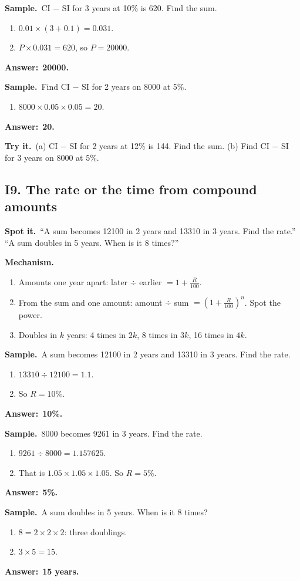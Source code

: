 \documentclass[11pt,a4paper]{article}
\let\oldsubsection\subsection
\renewcommand{\subsection}{\needspace{9\baselineskip}\oldsubsection}
\newcommand{\spot}{\textbf{\color{ember}Spot it.}\ }
\newcommand{\mech}{\textbf{\color{ember}Mechanism.}\ }
\newif\ifkeepsamp
\newcommand{\ans}[1]{\par\nopagebreak\noindent\textbf{\color{ember}Answer:}\ \textbf{#1}\par}
\newcommand{\samp}{\ifkeepsamp\needspace{4\baselineskip}\fi\textbf{\color{ember}Sample.}\ }
\newcommand{\tryit}[1]{\textbf{\color{ember}Try it.}\ #1}
\begin{document}
\samp CI $-$ SI for 3 years at 10\% is 620. Find the sum.
\begin{enumerate}
\item $0.01 \times (3 + 0.1) = 0.031$.
\item $P \times 0.031 = 620$, so $P = 20000$.
\end{enumerate}
\ans{20000.}

\samp Find CI $-$ SI for 2 years on 8000 at 5\%.
\begin{enumerate}
\item $8000 \times 0.05 \times 0.05 = 20$.
\end{enumerate}
\ans{20.}

\tryit (a) CI $-$ SI for 2 years at 12\% is 144. Find the sum. (b) Find CI $-$ SI for 3 years on 8000 at 5\%.

\subsection{I9. The rate or the time from compound amounts}
\spot ``A sum becomes 12100 in 2 years and 13310 in 3 years. Find the rate.'' ``A sum doubles in 5 years. When is it 8 times?''

\mech
\begin{enumerate}
\item Amounts one year apart: later $\div$ earlier $= 1 + \tfrac{R}{100}$.
\item From the sum and one amount: amount $\div$ sum $= \left(1 + \tfrac{R}{100}\right)^n$. Spot the power.
\item Doubles in $k$ years: 4 times in $2k$, 8 times in $3k$, 16 times in $4k$.
\end{enumerate}

\samp A sum becomes 12100 in 2 years and 13310 in 3 years. Find the rate.
\begin{enumerate}
\item $13310 \div 12100 = 1.1$.
\item So $R = 10\%$.
\end{enumerate}
\ans{10\%.}

\samp 8000 becomes 9261 in 3 years. Find the rate.
\begin{enumerate}
\item $9261 \div 8000 = 1.157625$.
\item That is $1.05 \times 1.05 \times 1.05$. So $R = 5\%$.
\end{enumerate}
\ans{5\%.}

\samp A sum doubles in 5 years. When is it 8 times?
\begin{enumerate}
\item $8 = 2 \times 2 \times 2$: three doublings.
\item $3 \times 5 = 15$.
\end{enumerate}
\ans{15 years.}
\end{document}
